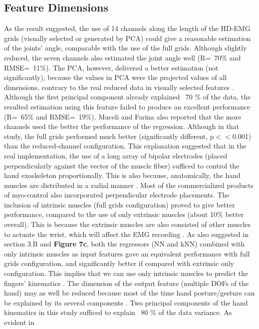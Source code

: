 \documentclass[conference]{IEEEtran}
\begin{document}
\subsection{Feature Dimensions}
As the result suggested, the use of 14 channels along the length of the HD-EMG grids (visually selected 
or generated by PCA) could give a reasonable estimation of the joints' angle, comparable with the use of the 
full grids. Although slightly reduced, the seven channels also estimated the joint angle well (R=~70\% 
and RMSE=~11\%). The PCA, however, delivered a better estimation (not significantly), because the values 
in PCA were the projected values of all dimensions, contrary to the real reduced data in visually selected 
features \cite{b37}. Although the first principal component already explained ~70 \% of the data, the resulted 
estimation using this feature failed to produce an excellent performance (R=~65\% and RMSE=~19\%). 
Muceli and Farina \cite{b9} also reported that the more channels used the better the performance of the 
regression. Although in that study, the full grids performed much better (significantly different, p$<<$0.001) 
than the reduced-channel configuration.
This explanation suggested that in the real implementation, the use of a long array of bipolar electrodes 
(placed perpendicularly against the vector of the muscle fiber) sufficed to control the hand exoskeleton 
proportionally. This is also because, anatomically, the hand muscles are distributed in a radial manner \cite{b38}. 
Most of the commercialized products of myo-control also incorporated perpendicular electrode placements.
The inclusion of intrinsic muscles (full grids configuration) proved to give better performance, 
compared to the use of only extrinsic muscles (about 10\% better overall). This is because the extrinsic 
muscles are also consisted of other muscles to actuate the wrist, which will affect the EMG recording \cite{b39}.
As also suggested in section 3.B and \textbf{Figure 7c}, both the regressors (NN and kNN) combined with only 
intrinsic muscles as input features gave an equivalent performance with full grids configuration, and 
significantly better if compared with extrinsic only configuration. This implies that we can use only intrinsic 
muscles to predict the fingers' kinematics \cite{b22}.
The dimension of the output feature (multiple DOFs of the hand) may as well be reduced because most 
of the time hand posture/gesture can be explained by its several components \cite{b32}\cite{b28}. Two principal 
components of the hand kinematics in this study sufficed to explain ~80 \% of the data variance. As evident in 
\end{document}
